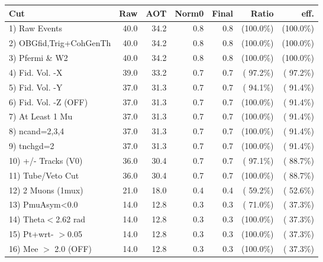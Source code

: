  \begin{table}[h!]\centering
 \begin{tabular}{||l||r|r|r|r|r|r||}
 \hline
 \hline
 Cut & Raw & AOT & Norm0 & Final & Ratio & eff.       \\
 \hline
  1) Raw Events           &         40.0 &         34.2 &          0.8 &          0.8 & (100.0\%) & (100.0\%) \\
  2) OBGfid,Trig+CohGenTh &         40.0 &         34.2 &          0.8 &          0.8 & (100.0\%) & (100.0\%) \\
  3) Pfermi \& W2         &         40.0 &         34.2 &          0.8 &          0.8 & (100.0\%) & (100.0\%) \\
  4) Fid. Vol. -X         &         39.0 &         33.2 &          0.7 &          0.7 & ( 97.2\%) & ( 97.2\%) \\
  5) Fid. Vol. -Y         &         37.0 &         31.3 &          0.7 &          0.7 & ( 94.1\%) & ( 91.4\%) \\
  6) Fid. Vol. -Z (OFF)   &         37.0 &         31.3 &          0.7 &          0.7 & (100.0\%) & ( 91.4\%) \\
  7) At Least 1 Mu        &         37.0 &         31.3 &          0.7 &          0.7 & (100.0\%) & ( 91.4\%) \\
  8) ncand=2,3,4          &         37.0 &         31.3 &          0.7 &          0.7 & (100.0\%) & ( 91.4\%) \\
  9) tnchgd=2             &         37.0 &         31.3 &          0.7 &          0.7 & (100.0\%) & ( 91.4\%) \\
 10) +/- Tracks (V0)      &         36.0 &         30.4 &          0.7 &          0.7 & ( 97.1\%) & ( 88.7\%) \\
 11) Tube/Veto Cut        &         36.0 &         30.4 &          0.7 &          0.7 & (100.0\%) & ( 88.7\%) \\
 12) 2 Muons (1mux)       &         21.0 &         18.0 &          0.4 &          0.4 & ( 59.2\%) & ( 52.6\%) \\
 13) PmuAsym<0.0          &         14.0 &         12.8 &          0.3 &          0.3 & ( 71.0\%) & ( 37.3\%) \\
 14) Theta$<$2.62 rad     &         14.0 &         12.8 &          0.3 &          0.3 & (100.0\%) & ( 37.3\%) \\
 15) Pt+wrt- $>$0.05      &         14.0 &         12.8 &          0.3 &          0.3 & (100.0\%) & ( 37.3\%) \\
 16) Mee $>$ 2.0  (OFF)   &         14.0 &         12.8 &          0.3 &          0.3 & (100.0\%) & ( 37.3\%) \\

\end{tabular}
\end{table}
